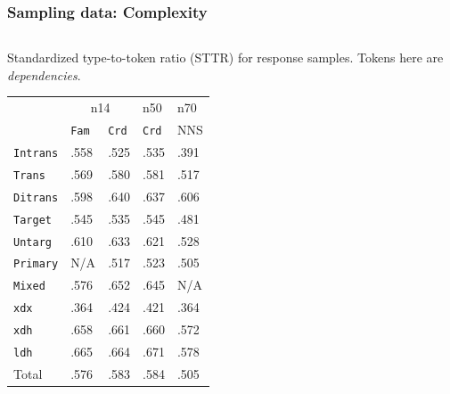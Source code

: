 \documentclass[xcolor={dvipsnames}]{beamer}
\newcommand{\param}[1]{\texttt{#1}}
\begin{document}
\begin{frame}
\frametitle{Sampling data: Complexity}
\small

\begin{columns}
\begin{column}{0.6\textwidth}
\begin{center}
\small
Standardized type-to-token ratio (STTR) for response samples. Tokens here are \textit{dependencies}. \\
\end{center}
\vspace{-1em}
\begin{table}[htb!]
\begin{center}
\setlength{\tabcolsep}{.5em}
\begin{tabular}{|l||l|l|l||l|}
\hline
 	& \multicolumn{2}{c|}{n14} & n50 & n70 \\
\cline{2-5}
   	& \param{Fam} & \param{Crd} & \param{Crd} 			& NNS			\\ \hline
\hline
\param{Intrans} & .558 	  		& .525 			& .535 		& .391 		\\ \hline
\param{Trans}   & .569        	& .580          & .581      & .517    	    \\ \hline
\param{Ditrans} & .598        	& .640          & .637      & .606    	    \\ 
\hline
\hline
\param{Target}  & .545 			& .535	 		& .545 		& .481			\\ \hline
\param{Untarg}  & .610        	& .633        	& .621    	& .528        	\\ \hline
\hline
\param{Prim\-a\-ry} & N/A       & .517 			& .523		& .505		 	\\ \hline
\param{Mix\-ed}   & .576        & .652          & .645      & N/A	        \\ \hline
\hline
\param{xdx}     & .364			& .424 			& .421		& .364			\\ \hline
\param{xdh}     & .658        	& .661          & .660      & .572	        \\ \hline
\param{ldh}     & .665        	& .664          & .671      & .578	        \\ \hline
\hline
Total    		& .576        	& .583         	& .584    	& .505	        \\ \hline
\end{tabular}
\end{center}
\end{table}

\end{column}


\end{columns}
\end{frame}
\end{document}

